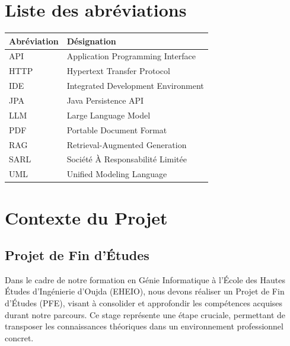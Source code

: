 \documentclass[12pt,a4paper]{report}
\begin{document}
	\pagestyle{empty} 
	
	\chapter*{Liste des abréviations}
	
	\begin{table}[htbp]
		\centering
		\begin{tabular}{|l|l|}
			\hline
			\textbf{Abréviation} & \textbf{Désignation} \\
			\hline
			API & Application Programming Interface \\
			\hline
			HTTP & Hypertext Transfer Protocol \\
			\hline
			IDE & Integrated Development Environment \\
			\hline
			JPA & Java Persistence API \\
			\hline
			LLM & Large Language Model \\
			\hline
			PDF & Portable Document Format \\
			\hline
			RAG & Retrieval-Augmented Generation \\
			\hline
			SARL & Société À Responsabilité Limitée \\
			\hline
			UML & Unified Modeling Language \\
			\hline
		\end{tabular}
		\label{tab:liste-abréviations}
	\end{table}
	
	\thispagestyle{empty}
	
	\listoffigures
	\thispagestyle{empty}   %
	
	\listoftables
	\thispagestyle{empty}
	
	\tableofcontents
	\thispagestyle{empty}
	
	\clearpage
	\pagestyle{plain}
	
	\chapter{Contexte du Projet}
	
	\section{Projet de Fin d’Études}
	
	Dans le cadre de notre formation en Génie Informatique à l’École des Hautes Études d’Ingénierie d’Oujda (EHEIO), nous devons réaliser un Projet de Fin d’Études (PFE), visant à consolider et approfondir les compétences acquises durant notre parcours. Ce stage représente une étape cruciale, permettant de transposer les connaissances théoriques dans un environnement professionnel concret.
	
\end{document}
